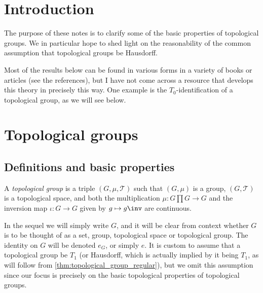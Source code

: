 \documentclass[article, a4paper, 11pt, oneside]{memoir}
\title{\doctitle}
\author{\docauthor}
\numberwithin{equation}{chapter}
\newcommand{\calT}{\mathcal{T}}
\begin{document}
\maketitle

\chapter{Introduction}

The purpose of these notes is to clarify some of the basic properties of topological groups. We in particular hope to shed light on the reasonability of the common assumption that topological groups be Hausdorff.

Most of the results below can be found in various forms in a variety of books or articles (see the references), but I have not come across a resource that develops this theory in precisely this way. One example is the $T_0$-identification of a topological group, as we will see below.


\chapter{Topological groups}

\section{Definitions and basic properties}

\begin{definition}
    \label{def:topological_group}
    A \emph{topological group} is a triple $(G, \mu, \calT)$ such that $(G, \mu)$ is a group, $(G, \calT)$ is a topological space, and both the multiplication $\mu \colon G \prod G \to G$ and the inversion map $\iota \colon G \to G$ given by $g \mapsto g\inv$ are continuous.
\end{definition}
%
In the sequel we will simply write $G$, and it will be clear from context whether $G$ is to be thought of as a set, group, topological space or topological group. The identity on $G$ will be denoted $e_G$, or simply $e$. It is custom to assume that a topological group be $T_1$ (or Hausdorff, which is actually implied by it being $T_1$, as will follow from \cref{thm:topological_group_regular}), but we omit this assumption since our focus is precisely on the basic topological properties of topological groups.

\newcommand{\leftmult}{\lambda}
\newcommand{\rightmult}{\rho}
\newcommand{\conjmult}{\gamma}
\end{document}
